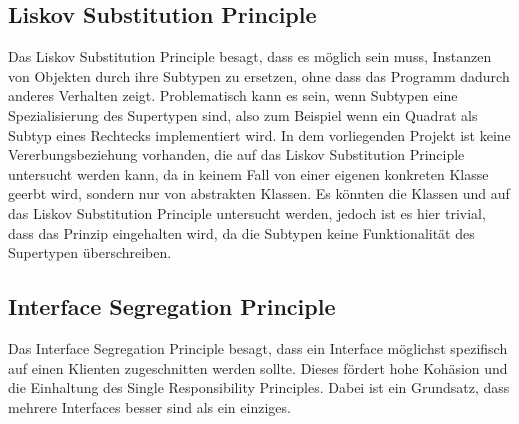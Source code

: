 \subsection{Liskov Substitution Principle}
Das Liskov Substitution Principle besagt, dass es möglich sein muss, Instanzen von Objekten durch ihre Subtypen zu ersetzen, ohne dass das Programm dadurch anderes Verhalten zeigt. Problematisch kann es sein, wenn Subtypen eine Spezialisierung des Supertypen sind, also zum Beispiel wenn ein Quadrat als Subtyp eines Rechtecks implementiert wird. In dem vorliegenden Projekt ist keine Vererbungsbeziehung vorhanden, die auf das Liskov Substitution Principle untersucht werden kann, da in keinem Fall von einer eigenen konkreten Klasse geerbt wird, sondern nur von abstrakten Klassen. Es könnten die Klassen \href{https://github.com/anditru/quickie/blob/bb41442c7f1ffbfcd3117cd86a40f7932e543a33/1-quickie-adapters/src/main/java/org/pinkcrazyunicorn/quickie/adapters/event/MapEventAnswerData.java}{} und \href{https://github.com/anditru/quickie/blob/bb41442c7f1ffbfcd3117cd86a40f7932e543a33/1-quickie-adapters/src/main/java/org/pinkcrazyunicorn/quickie/adapters/event/ListEventAnswerData.java}{} auf das Liskov Substitution Principle untersucht werden, jedoch ist es hier trivial, dass das Prinzip eingehalten wird, da die Subtypen keine Funktionalität des Supertypen überschreiben.

\subsection{Interface Segregation Principle}
Das Interface Segregation Principle besagt, dass ein Interface möglichst spezifisch auf einen Klienten zugeschnitten werden sollte. Dieses fördert hohe Kohäsion und die Einhaltung des Single Responsibility Principles. Dabei ist ein Grundsatz, dass mehrere Interfaces besser sind als ein einziges.

